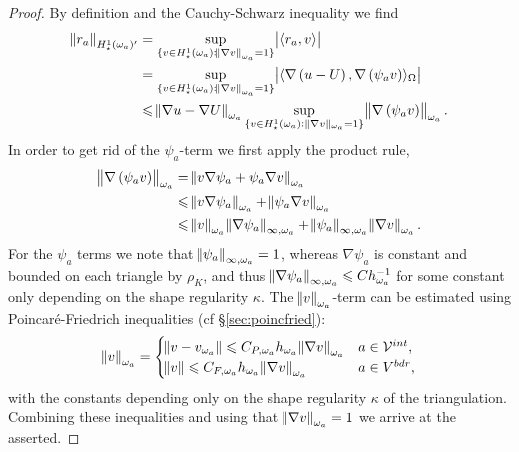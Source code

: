 \documentclass[thesis.tex]{subfiles}
\begin{document}
\begin{proof}
  By definition and the Cauchy-Schwarz inequality we find
  \begin{align*}
    \norm{r_a}_{H_\star^1(\omega_a)'} &= \sup_{\{v \in H_\star^1(\omega_a) : \norm{\nabla v}_{\omega_a} = 1\}} \abs{\langle r_a, v \rangle}\\
    &= \sup_{\{v \in H_\star^1(\omega_a) : \norm{\nabla v}_{\omega_a} = 1\}} \abs{\langle \nabla \left(u - U\right), \nabla \left(\psi_a v\right) \rangle_\Omega} \\
    &\leqslant \norm{\nabla u - \nabla U}_{\omega_a} \sup_{\{v \in H_\star^1(\omega_a): \|\nabla v\|_{\omega_a}=1\}} \norm{ \nabla \left (\psi_a v \right)}_{\omega_a}.
  \end{align*}
  In order to get rid of the $\psi_a$-term we first apply the product rule,
  \begin{align*}
    \norm{\nabla\left(\psi_a v\right)}_{\omega_a} &= \norm{v \nabla \psi_a + \psi_a \nabla v}_{\omega_a}\\
    &\leqslant \norm{v \nabla \psi_a}_{\omega_a} + \norm{\psi_a \nabla v}_{\omega_a} \\
    &\leqslant \norm{v}_{\omega_a} \norm{\nabla \psi_a}_{\infty, \omega_a} + \norm{\psi_a}_{\infty, \omega_a} \norm{\nabla v}_{\omega_a}.
  \end{align*}
 For the $\psi_a$ terms we note that 
  $\norm{\psi_a}_{\infty, \omega_a} = 1$, whereas $\nabla \psi_a$ is constant and bounded on each triangle by
  $\rho_{K}$, and thus $\norm{\nabla \psi_a}_{\infty, \omega_a} \leqslant C h^{-1}_{\omega_a}$ for some constant only depending on the 
  shape regularity $\kappa$. 
  The $\norm{v}_{\omega_a}$-term can be estimated using Poincar\'e-Friedrich inequalities (cf \S\ref{sec:poincfried}):
  \[
    \norm{v}_{\omega_a} = \begin{cases}
      \norm{v - v_{\omega_a}} \leqslant C_{P,\omega_a} h_{\omega_a}\norm{\nabla v}_{\omega_a} & a \in \mathcal{V}^{int}, \\
      \norm{v} \leqslant C_{F,\omega_a} h_{\omega_a}\norm{\nabla v}_{\omega_a} & a \in V^{bdr},
    \end{cases}
  \]
  with the constants depending only on the shape regularity $\kappa$ of the triangulation.
  Combining these inequalities and using that $\norm{\nabla v}_{\omega_a} = 1$ we arrive at the asserted.
\end{proof}
\end{document}
